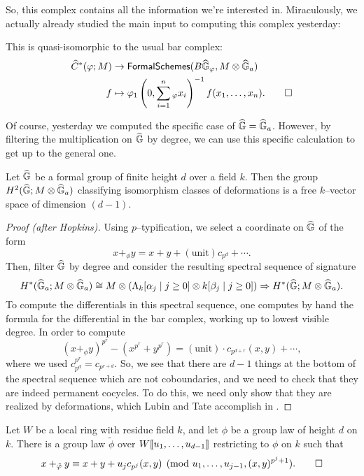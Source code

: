 So, this complex contains all the information we're interested in.  Miraculously, we actually already studied the main input to computing this complex yesterday:

\begin{lemma}
This is quasi-isomorphic to the usual bar complex:
\begin{align*}
\widehat C^*(\phi; M) & \to \CatOf{FormalSchemes}(B\G_\phi, M \otimes \G_a) \\
f & \mapsto \phi_1\left(0, \sum_{i=1}^n{}_\phi x_i \right)^{-1} f(x_1, \ldots, x_n). \qed
\end{align*}
\end{lemma}

Of course, yesterday we computed the specific case of $\G = \G_a$.  However, by filtering the multiplication on $\G$ by degree, we can use this specific calculation to get up to the general one.

\begin{lemma}\label{CalculationOfLTTangentSpace}
Let $\G$ be a formal group of finite height $d$ over a field $k$.  Then the group $H^2(\G; M \otimes \G_a)$ classifying isomorphism classes of deformations is a free $k$--vector space of dimension $(d - 1)$.
\end{lemma}
\begin{proof}[Proof (after Hopkins)]
Using $p$--typification, we select a coordinate on $\G$ of the form \[x +_\phi y = x + y + (\mathrm{unit}) c_{p^d} + \cdots.\]  Then, filter $\G$ by degree and consider the resulting spectral sequence of signature \[H^*(\G_a; M \otimes \G_a) \cong M \otimes (\Lambda_k[\alpha_j \mid j \ge 0] \otimes k[\beta_j \mid j \ge 0]) \Rightarrow H^*(\G; M \otimes \G_a).\]  To compute the differentials in this spectral sequence, one computes by hand the formula for the differential in the bar complex, working up to lowest visible degree.  In order to compute  \[(x +_\phi y)^{p^r} - (x^{p^r} + y^{p^r}) = (\text{unit}) \cdot c_{p^{d + r}}(x, y) + \cdots,\] where we used $c_{p^d}^{p^r} = c_{p^{r+d}}$.  So, we see that there are $d - 1$ things at the bottom of the spectral sequence which are not coboundaries, and we need to check that they are indeed permanent cocycles.  To do this, we need only show that they are realized by deformations, which Lubin and Tate accomplish in .
\end{proof}
\begin{lemma}\label{LubinTateRealizationLemma}
Let $W$ be a local ring with residue field $k$, and let $\phi$ be a group law of height $d$ on $k$.  There is a group law $\tilde\phi$ over $W\ps{u_1, \ldots, u_{d-1}}$ restricting to $\phi$ on $k$ such that \[x +_{\tilde \phi} y \equiv x + y + u_j c_{p^j}(x, y) \pmod{u_1, \ldots, u_{j-1}, (x, y)^{p^j+1}}. \qed\]
\end{lemma}

